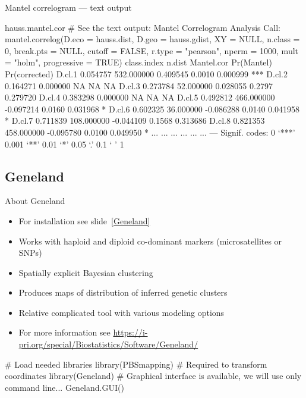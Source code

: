 \documentclass[compress, ucs, xelatex, 11pt, xcolor=svgnames,
	hyperref={
		bookmarks=true,
		unicode=true,
		colorlinks=true,
		pdftitle={Molecular data in R},
		plainpages=false,
		pdfauthor={Vojtech Zeisek},
		pdfsubject={Course about phylogeny and evolution in R},
		pdfcreator={XeLaTeX},
		pdfkeywords={R, evolution, phylogeny, molecular data},
		linkcolor=Tomato,
		anchorcolor=SaddleBrown,
		citecolor=Goldenrod,
		filecolor=DarkMagenta,
		menucolor=Sienna,
		urlcolor=DarkTurquoise,
		pdftex},
	url={hyphens, lowtilde} %
	]{beamer}
\begin{document}
\begin{frame}[fragile]{Mantel correlogram --- text output}
	\begin{spluscode}
    hauss.mantel.cor # See the text output:
    Mantel Correlogram Analysis
    Call:
    mantel.correlog(D.eco = hauss.dist, D.geo = hauss.gdist, XY = NULL,
     n.class = 0, break.pts = NULL, cutoff = FALSE, r.type = "pearson",
     nperm = 1000, mult = "holm", progressive = TRUE)
            class.index     n.dist Mantel.cor Pr(Mantel) Pr(corrected)
    D.cl.1     0.054757 532.000000   0.409545     0.0010      0.000999 ***
    D.cl.2     0.164271   0.000000         NA         NA            NA
    D.cl.3     0.273784  52.000000   0.028055     0.2797      0.279720
    D.cl.4     0.383298   0.000000         NA         NA            NA
    D.cl.5     0.492812 466.000000  -0.097214     0.0160      0.031968 *
    D.cl.6     0.602325  36.000000  -0.086288     0.0140      0.041958 *
    D.cl.7     0.711839 108.000000  -0.044109     0.1568      0.313686
    D.cl.8     0.821353 458.000000  -0.095780     0.0100      0.049950 *
       ...          ...        ...        ...        ...           ...
    ---
    Signif. codes:  0 ‘***’ 0.001 ‘**’ 0.01 ‘*’ 0.05 ‘.’ 0.1 ‘ ’ 1
	\end{spluscode}
\end{frame}

\subsection{Geneland}

\begin{frame}[fragile]{About Geneland}
	\label{GenelandUse}
	\begin{itemize}
		\item For installation see slide~\ref{Geneland}
		\item Works with haploid and diploid co-dominant markers (microsatellites or SNPs)
		\item Spatially explicit Bayesian clustering
		\item Produces maps of distribution of inferred genetic clusters
		\item Relative complicated tool with various modeling options
		\item For more information see \url{https://i-pri.org/special/Biostatistics/Software/Geneland/}
	\end{itemize}
	\vfill
	\begin{spluscode}
    # Load needed libraries
    library(PBSmapping) # Required to transform coordinates
    library(Geneland)
    # Graphical interface is available, we will use only command line...
    Geneland.GUI()
	\end{spluscode}
\end{frame}
\end{document}
